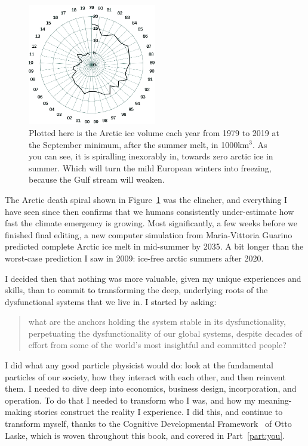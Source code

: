 \begin{figure}
\includegraphics[width=0.50\textwidth]{./Images/arctic-death-spiral}
\caption[Arctic ice death spiral]{Plotted here is the Arctic ice volume\cite{piomas-data} each year from 1979 to 2019 at the September minimum, after the summer melt, in 1000km$^3$. As you can see, it is spiralling inexorably in, towards zero arctic ice in summer. Which will turn the mild European winters into freezing, because the Gulf stream will weaken.}
\label{fig:arctic-death-spiral}
\end{figure}


The Arctic death spiral shown in Figure~\ref{fig:arctic-death-spiral} was the clincher, and everything I have seen since then confirms that we humans consistently under-estimate how fast the climate emergency is growing. Most significantly, a few weeks before we finished final editing, a new computer simulation from Maria-Vittoria Guarino predicted complete Arctic ice melt in mid-summer\cite{guarino-2035} by 2035. A bit longer than the worst-case prediction I saw in 2009: ice-free arctic summers after 2020.


I decided then that nothing was more valuable, given my unique experiences and skills, than to commit to transforming the deep, underlying roots of the dysfunctional systems that we live in. I started by asking: 
\begin{quote} 
what are the anchors holding the system stable in its dysfunctionality, perpetuating the dysfunctionality of our global systems, despite decades of effort from some of the world's most insightful and committed people?
\end{quote}


I did what any good particle physicist would do: look at the fundamental particles of our society, how they interact with each other, and then reinvent them. I needed to dive deep into economics, business design, incorporation, and operation. To do that I needed to transform who I was, and how my meaning-making stories construct the reality I experience. I did this, and continue to transform myself, thanks to the Cognitive Developmental Framework~\cite{laske-vol1,laske-vol2} of Otto Laske, which is woven throughout this book, and covered in Part~\ref{part:you}.


